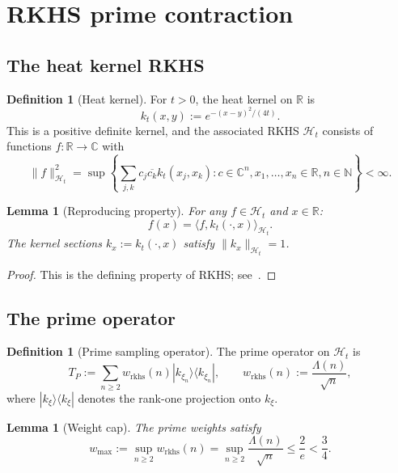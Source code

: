 \documentclass[11pt,a4paper]{article}
\newtheorem{lemma}[theorem]{Lemma}
\theoremstyle{definition}
\newtheorem{definition}[theorem]{Definition}
\theoremstyle{remark}
\newcommand{\R}{\mathbb{R}}
\newcommand{\C}{\mathbb{C}}
\newcommand{\N}{\mathbb{N}}
\begin{document}
\section{RKHS prime contraction}\label{sec:rkhs}

\subsection{The heat kernel RKHS}

\begin{definition}[Heat kernel]
For $t > 0$, the heat kernel on $\R$ is
\[
  k_t(x, y) := e^{-(x-y)^2/(4t)}.
\]
This is a positive definite kernel, and the associated RKHS $\mathcal{H}_t$ consists of functions $f : \R \to \C$ with
\[
  \|f\|_{\mathcal{H}_t}^2 = \sup \left\{ \sum_{j,k} c_j \overline{c_k} k_t(x_j, x_k) : c \in \C^n, x_1, \ldots, x_n \in \R, n \in \N \right\} < \infty.
\]
\end{definition}

\begin{lemma}[Reproducing property]\label{lem:repro}
For any $f \in \mathcal{H}_t$ and $x \in \R$:
\[
  f(x) = \langle f, k_t(\cdot, x) \rangle_{\mathcal{H}_t}.
\]
The kernel sections $k_x := k_t(\cdot, x)$ satisfy $\|k_x\|_{\mathcal{H}_t} = 1$.
\end{lemma}

\begin{proof}
This is the defining property of RKHS; see~\cite{Aronszajn1950,PaulsenRaghupathi2016}.
\end{proof}

\subsection{The prime operator}

\begin{definition}[Prime sampling operator]
The prime operator on $\mathcal{H}_t$ is
\[
  T_P := \sum_{n \geq 2} w_{\mathrm{rkhs}}(n) |k_{\xi_n}\rangle \langle k_{\xi_n}|,
  \qquad w_{\mathrm{rkhs}}(n) := \frac{\Lambda(n)}{\sqrt{n}},
\]
where $|k_\xi\rangle \langle k_\xi|$ denotes the rank-one projection onto $k_\xi$.
\end{definition}

\begin{lemma}[Weight cap]\label{lem:weight-cap}
The prime weights satisfy
\[
  w_{\max} := \sup_{n \geq 2} w_{\mathrm{rkhs}}(n) = \sup_{n \geq 2} \frac{\Lambda(n)}{\sqrt{n}} \leq \frac{2}{e} < \frac{3}{4}.
\]
\end{lemma}
\end{document}
